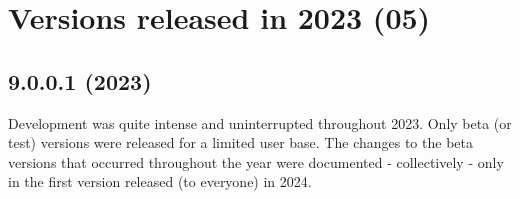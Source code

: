 
\hypertarget{2023}{}
\section{Versions released in 2023 (05)}

\subsection*{9.0.0.1 (2023)}
Development was quite intense and uninterrupted throughout 2023. Only beta (or test) versions
were released for a limited user base. The changes to the beta versions that occurred throughout
the year were documented - collectively - only in the first version released (to everyone) in 2024.
